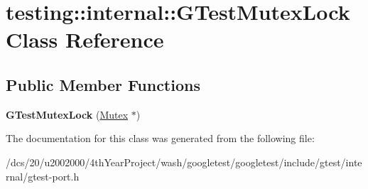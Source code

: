 \hypertarget{classtesting_1_1internal_1_1GTestMutexLock}{}\section{testing\+:\+:internal\+:\+:G\+Test\+Mutex\+Lock Class Reference}
\label{classtesting_1_1internal_1_1GTestMutexLock}
\subsection*{Public Member Functions}
\begin{DoxyCompactItemize}
\item 
\mbox{\label{classtesting_1_1internal_1_1GTestMutexLock_a77e3cba326d5356b4a1dea3790559c26}} 
{\bfseries G\+Test\+Mutex\+Lock} (\mbox{\hyperlink{classtesting_1_1internal_1_1Mutex}{Mutex}} $\ast$)
\end{DoxyCompactItemize}


The documentation for this class was generated from the following file\+:\begin{DoxyCompactItemize}
\item 
/dcs/20/u2002000/4th\+Year\+Project/wash/googletest/googletest/include/gtest/internal/gtest-\/port.\+h\end{DoxyCompactItemize}
